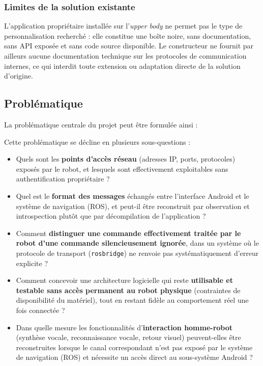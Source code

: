 \subsubsection*{Limites de la solution existante}

L'application propriétaire installée sur l'\textit{upper body} ne permet pas
le type de personnalisation recherché : elle constitue une boîte noire, sans
documentation, sans API exposée et sans code source disponible. Le
constructeur ne fournit par ailleurs aucune documentation technique sur les
protocoles de communication internes, ce qui interdit toute extension ou
adaptation directe de la solution d'origine.

\subsection{Problématique}

La problématique centrale du projet peut être formulée ainsi :

\begin{center}
\end{center}

\medskip
Cette problématique se décline en plusieurs sous-questions :

\begin{itemize}
    \item Quels sont les \textbf{points d'accès réseau} (adresses IP, ports,
    protocoles) exposés par le robot, et lesquels sont effectivement exploitables
    sans authentification propriétaire ?
    \item Quel est le \textbf{format des messages} échangés entre l'interface
    Android et le système de navigation (ROS), et peut-il être reconstruit par
    observation et introspection plutôt que par décompilation de l'application ?
    \item Comment \textbf{distinguer une commande effectivement traitée par le
    robot d'une commande silencieusement ignorée}, dans un système où le protocole
    de transport (\texttt{rosbridge}) ne renvoie pas systématiquement d'erreur
    explicite ?
    \item Comment concevoir une architecture logicielle qui reste
    \textbf{utilisable et testable sans accès permanent au robot physique}
    (contraintes de disponibilité du matériel), tout en restant fidèle au
    comportement réel une fois connectée ?
    \item Dans quelle mesure les fonctionnalités d'\textbf{interaction homme-robot}
    (synthèse vocale, reconnaissance vocale, retour visuel) peuvent-elles être
    reconstruites lorsque le canal correspondant n'est pas exposé par le système
    de navigation (ROS) et nécessite un accès direct au sous-système Android ?
\end{itemize}

